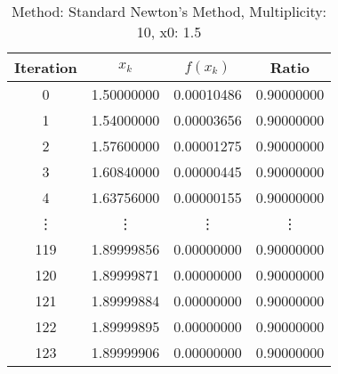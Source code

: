 \begin{table}
\centering
\caption{Method: Standard Newton's Method, Multiplicity: 10, x0: 1.5}
\label{tab:table_Standard_Newton's_Method_10_1_5}
\begin{tabular}{c c c c}
\toprule
Iteration &      $x_k$ &   $f(x_k)$ &      Ratio \\
\midrule
        0 & 1.50000000 & 0.00010486 & 0.90000000 \\
        1 & 1.54000000 & 0.00003656 & 0.90000000 \\
        2 & 1.57600000 & 0.00001275 & 0.90000000 \\
        3 & 1.60840000 & 0.00000445 & 0.90000000 \\
        4 & 1.63756000 & 0.00000155 & 0.90000000 \\
   \vdots &     \vdots &     \vdots &     \vdots \\
      119 & 1.89999856 & 0.00000000 & 0.90000000 \\
      120 & 1.89999871 & 0.00000000 & 0.90000000 \\
      121 & 1.89999884 & 0.00000000 & 0.90000000 \\
      122 & 1.89999895 & 0.00000000 & 0.90000000 \\
      123 & 1.89999906 & 0.00000000 & 0.90000000 \\
\bottomrule
\end{tabular}
\end{table}
